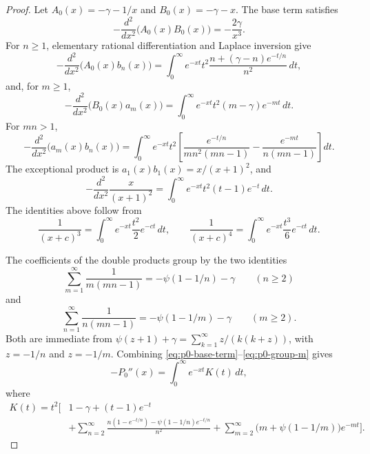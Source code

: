 \documentclass[11pt]{article}
\numberwithin{equation}{section}
\theoremstyle{definition}
\theoremstyle{remark}
\newcommand{\1}{\mathbf 1}
\begin{document}
\begin{proof}
Let \(A_0(x)=-\gamma-1/x\) and \(B_0(x)=-\gamma-x\).  The base term satisfies
\begin{equation}
\label{eq:p0-base-term}
-\frac{d^2}{dx^2}\bigl(A_0(x)B_0(x)\bigr)=-\frac{2\gamma}{x^3}.
\end{equation}
For \(n\ge1\), elementary rational differentiation and Laplace inversion give
\begin{equation}
\label{eq:p0-a0bn-laplace}
-\frac{d^2}{dx^2}\bigl(A_0(x)b_n(x)\bigr)
=\int_0^\infty e^{-xt}t^2\frac{n+(\gamma-n)e^{-t/n}}{n^2}\,dt,
\end{equation}
and, for \(m\ge1\),
\begin{equation}
\label{eq:p0-b0am-laplace}
-\frac{d^2}{dx^2}\bigl(B_0(x)a_m(x)\bigr)
=\int_0^\infty e^{-xt}t^2(m-\gamma)e^{-mt}\,dt.
\end{equation}
For \(mn>1\),
\begin{equation}
\label{eq:p0-ambn-laplace}
-\frac{d^2}{dx^2}\bigl(a_m(x)b_n(x)\bigr)
=\int_0^\infty e^{-xt}t^2
\left[
\frac{e^{-t/n}}{mn^2(mn-1)}
-\frac{e^{-mt}}{n(mn-1)}
\right]dt.
\end{equation}
The exceptional product is \(a_1(x)b_1(x)=x/(x+1)^2\), and
\begin{equation}
\label{eq:p0-exceptional-laplace}
-\frac{d^2}{dx^2}\frac{x}{(x+1)^2}
=\int_0^\infty e^{-xt}t^2(t-1)e^{-t}\,dt.
\end{equation}
The identities above follow from
\begin{equation}
\label{eq:p0-laplace-powers}
\frac1{(x+c)^3}=\int_0^\infty e^{-xt}\frac{t^2}{2}e^{-ct}\,dt,
\qquad
\frac1{(x+c)^4}=\int_0^\infty e^{-xt}\frac{t^3}{6}e^{-ct}\,dt.
\end{equation}

The coefficients of the double products group by the two identities
\begin{equation}
\label{eq:p0-group-n}
\sum_{m=1}^{\infty}\frac1{m(mn-1)}
=-\psi(1-1/n)-\gamma
\qquad(n\ge2)
\end{equation}
and
\begin{equation}
\label{eq:p0-group-m}
\sum_{n=1}^{\infty}\frac1{n(mn-1)}
=-\psi(1-1/m)-\gamma
\qquad(m\ge2).
\end{equation}
Both are immediate from \(\psi(z+1)+\gamma=\sum_{k=1}^\infty z/(k(k+z))\), with \(z=-1/n\) and \(z=-1/m\).  Combining \eqref{eq:p0-base-term}--\eqref{eq:p0-group-m} gives
\begin{equation}
\label{eq:p0-laplace-kernel-representation}
-P_0''(x)=\int_0^\infty e^{-xt}K(t)\,dt,
\end{equation}
where
\begin{equation}
\label{eq:p0-kernel}
\begin{aligned}
K(t)=t^2\Bigg[
&1-\gamma+(t-1)e^{-t}\\
&+\sum_{n=2}^{\infty}
\frac{n(1-e^{-t/n})-\psi(1-1/n)e^{-t/n}}{n^2}
+\sum_{m=2}^{\infty}\bigl(m+\psi(1-1/m)\bigr)e^{-mt}
\Bigg].
\end{aligned}
\end{equation}


\end{proof}
\end{document}
